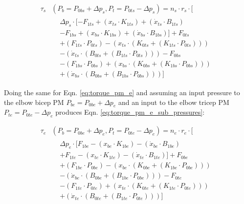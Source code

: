 \documentclass[conference]{IEEEtran}
\begin{document}
	\begin{equation}\label{eq:torque_pm_s_sub_pressures}
		\begin{aligned}
			\tau_{s}&(P_{b}=P_{0bs}+\Delta p_{s}, P_{t}=P_{0ts}-\Delta p_{s}) = n_{s} \cdot r_{s} \cdot \lbrack\\
			&
			\begin{aligned}
				&\Delta p_{s} \cdot \lbrack -F_{1ts} + (x_{ts} \cdot K_{1ts}) + (\dot{x}_{ts} \cdot B_{1ts})\\
				&- F_{1bs} + (x_{bs} \cdot K_{1bs}) + (\dot{x}_{bs} \cdot B_{1bs}) \rbrack + F_{0ts}\\
				&+ (F_{1ts} \cdot P_{0ts}) - (x_{ts} \cdot (K_{0ts} + (K_{1ts}\cdot P_{0ts})))\\
				&- (\dot{x}_{ts} \cdot (B_{0ts} + (B_{1ts}\cdot P_{0ts}))) - F_{0bs}\\
				&- (F_{1bs} \cdot P_{0bs}) + (x_{bs} \cdot (K_{0bs} + (K_{1bs}\cdot P_{0bs})))\\
				&+ (\dot{x}_{bs} \cdot (B_{0bs} + (B_{1bs}\cdot P_{0bs}))) \rbrack
			\end{aligned}
		\end{aligned}
	\end{equation}

	Doing the same for Eqn. \eqref{eq:torque_pm_e} and assuming an input pressure to the elbow bicep \ac{PM} $P_{be} = P_{0be} + \Delta p_{e}$ and an input to the elbow tricep \ac{PM} $P_{te} = P_{0te} - \Delta p_{e}$ produces Eqn. \eqref{eq:torque_pm_e_sub_pressures}:
	
	\begin{equation}\label{eq:torque_pm_e_sub_pressures}
		\begin{aligned}
			\tau_{e}&(P_{b}=P_{0be}+\Delta p_{e}, P_{t}=P_{0te}-\Delta p_{e}) = n_{e} \cdot r_{e} \cdot \lbrack\\
			&
			\begin{aligned}
				&\Delta p_{e} \cdot \lbrack F_{1be} - (x_{be} \cdot K_{1be}) - (\dot{x}_{be} \cdot B_{1be})\\
				&+ F_{1te} - (x_{te} \cdot K_{1te}) - (\dot{x}_{te} \cdot B_{1te}) \rbrack + F_{0be}\\
				&+ (F_{1be} \cdot P_{0be}) - (x_{be} \cdot (K_{0be} + (K_{1be}\cdot P_{0be})))\\
				&- (\dot{x}_{be} \cdot (B_{0be} + (B_{1be}\cdot P_{0be}))) - F_{0te}\\
				&- (F_{1te} \cdot P_{0te}) + (x_{te} \cdot (K_{0te} + (K_{1te}\cdot P_{0te})))\\
				&+ (\dot{x}_{te} \cdot (B_{0te} + (B_{1te}\cdot P_{0te}))) \rbrack
			\end{aligned}
		\end{aligned}
	\end{equation}
\end{document}
